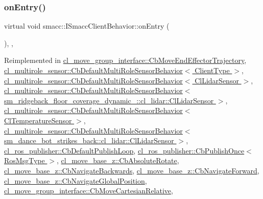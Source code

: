 \subsubsection{\texorpdfstring{on\+Entry()}{onEntry()}}
{\footnotesize\ttfamily virtual void smacc\+::\+I\+Smacc\+Client\+Behavior\+::on\+Entry (\begin{DoxyParamCaption}{ }\end{DoxyParamCaption})\hspace{0.3cm}{\ttfamily [inline]}, {\ttfamily [protected]}, {\ttfamily [virtual]}}



Reimplemented in \hyperlink{classcl__move__group__interface_1_1CbMoveEndEffectorTrajectory_aaedd074fd178c6390a4a3f1ccff23ad3}{cl\+\_\+move\+\_\+group\+\_\+interface\+::\+Cb\+Move\+End\+Effector\+Trajectory}, \hyperlink{classcl__multirole__sensor_1_1CbDefaultMultiRoleSensorBehavior_a5ac29f93cc91e23715f51ade94467cae}{cl\+\_\+multirole\+\_\+sensor\+::\+Cb\+Default\+Multi\+Role\+Sensor\+Behavior$<$ Client\+Type $>$}, \hyperlink{classcl__multirole__sensor_1_1CbDefaultMultiRoleSensorBehavior_a5ac29f93cc91e23715f51ade94467cae}{cl\+\_\+multirole\+\_\+sensor\+::\+Cb\+Default\+Multi\+Role\+Sensor\+Behavior$<$ Cl\+Lidar\+Sensor $>$}, \hyperlink{classcl__multirole__sensor_1_1CbDefaultMultiRoleSensorBehavior_a5ac29f93cc91e23715f51ade94467cae}{cl\+\_\+multirole\+\_\+sensor\+::\+Cb\+Default\+Multi\+Role\+Sensor\+Behavior$<$ sm\+\_\+ridgeback\+\_\+floor\+\_\+coverage\+\_\+dynamic\+\_\+::cl\+\_\+lidar\+::\+Cl\+Lidar\+Sensor $>$}, \hyperlink{classcl__multirole__sensor_1_1CbDefaultMultiRoleSensorBehavior_a5ac29f93cc91e23715f51ade94467cae}{cl\+\_\+multirole\+\_\+sensor\+::\+Cb\+Default\+Multi\+Role\+Sensor\+Behavior$<$ Cl\+Temperature\+Sensor $>$}, \hyperlink{classcl__multirole__sensor_1_1CbDefaultMultiRoleSensorBehavior_a5ac29f93cc91e23715f51ade94467cae}{cl\+\_\+multirole\+\_\+sensor\+::\+Cb\+Default\+Multi\+Role\+Sensor\+Behavior$<$ sm\+\_\+dance\+\_\+bot\+\_\+strikes\+\_\+back\+::cl\+\_\+lidar\+::\+Cl\+Lidar\+Sensor $>$}, \hyperlink{classcl__ros__publisher_1_1CbDefaultPublishLoop_a6e6cfb477cbefc510ca7b55a061545e4}{cl\+\_\+ros\+\_\+publisher\+::\+Cb\+Default\+Publish\+Loop}, \hyperlink{classcl__ros__publisher_1_1CbPublishOnce_afaed71bc2694ec1837278d5f931a76e1}{cl\+\_\+ros\+\_\+publisher\+::\+Cb\+Publish\+Once$<$ Ros\+Msg\+Type $>$}, \hyperlink{classcl__move__base__z_1_1CbAbsoluteRotate_a10418ea360809fa649d295716b152b2b}{cl\+\_\+move\+\_\+base\+\_\+z\+::\+Cb\+Absolute\+Rotate}, \hyperlink{classcl__move__base__z_1_1CbNavigateBackwards_a545a5282f0ef6b0080b46002d6037567}{cl\+\_\+move\+\_\+base\+\_\+z\+::\+Cb\+Navigate\+Backwards}, \hyperlink{classcl__move__base__z_1_1CbNavigateForward_af9a2e49071de287922c3f5963a079b95}{cl\+\_\+move\+\_\+base\+\_\+z\+::\+Cb\+Navigate\+Forward}, \hyperlink{classcl__move__base__z_1_1CbNavigateGlobalPosition_a66d8b0555ef2945bc108dcd5171be292}{cl\+\_\+move\+\_\+base\+\_\+z\+::\+Cb\+Navigate\+Global\+Position}, \hyperlink{classcl__move__group__interface_1_1CbMoveCartesianRelative_a7d65e3d5fa3f2c7b47d9cbe631f448ad}{cl\+\_\+move\+\_\+group\+\_\+interface\+::\+Cb\+Move\+Cartesian\+Relative}, 